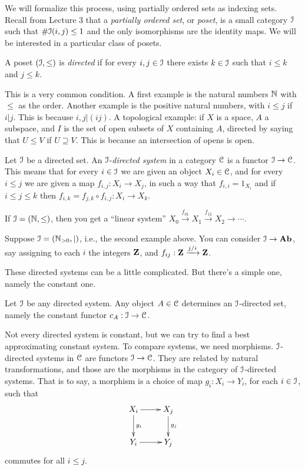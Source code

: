 We will formalize this process, using partially ordered sets as indexing sets.
Recall from Lecture 3 
that a {\em partially ordered set}, or {\em poset}, is a small category $\mathcal I$ such that $\#\mathcal I(i,j)\leq 1$ and the only isomorphisms are the identity maps. We will be interested in a particular class of posets.
\begin{definition}
A poset $(\mathcal I,\leq)$ is \emph{directed} if for every $i,j\in\mathcal I$
there exists  $k\in\mathcal I$ such that $i\leq k$ and $j\leq k$.
\end{definition}
\begin{example}
This is a very common condition.
A first example is the natural numbers $\mathbb N$ with $\leq$ as the order. Another example is the positive natural numbers, with $i\leq j$ if $i|j$. This is because $i,j|(ij)$. A topological example: if $X$ is a space, $A$ a subspace, and 
$I$ is the set of open subsets of $X$ containing $A$, directed by saying that $U\leq V$ if $U\supseteq V$. This is because an intersection of opens is open.
\end{example}
\begin{definition}
Let $\mathcal I$ be a directed set. An $\mathcal I$-{\em directed system} in  a category $\mathcal C$ is a functor $\mathcal I\to\mathcal C$. This means that for every $i\in \mathcal I$ we are given an object $X_i\in\mathcal C$, and for every $i\leq j$ we are given a map $f_{i,j}:X_i\to X_j$, in such a way that $f_{i,i}=1_{X_i}$ and if $i\leq j\leq k$
then $f_{i,k}=f_{j,k}\circ f_{i,j}:X_i\to X_k$. 
\end{definition}
\begin{example}\label{linear}
If $\mathcal I=(\mathbb N,\leq)$, then you get a ``linear system'' $X_0\xrightarrow{f_{01}}X_1\xrightarrow{f_{12}}X_2\to\cdots$. 
\end{example}
\begin{example}
Suppose $\mathcal I=(\mathbb N_{>0},|)$, i.e., the second example above. You can consider $\mathcal I\to\mathbf{Ab}$, say assigning to each $i$ the integers $\mathbf Z$, and $f_{ij}:\mathbf Z\xrightarrow{j/i}\mathbf Z$. 
\end{example}
These directed systems can be a little complicated. But there's a simple one, namely the constant one. 
\begin{example}
Let $\mathcal I$ be any directed system. Any object $A\in\mathcal C$ determines an $\mathcal I$-directed set, namely the constant functor $c_A:\mathcal I\to\mathcal C$.
\end{example}
Not every directed system is constant, but we can try to find a best approximating constant system. To compare systems, we need morphisms. 
$\mathcal I$-directed systems in $\mathcal C$ are functors $\mathcal I\to\mathcal C$. They are related by natural transformations, and those are the morphisms in the category of $\mathcal I$-directed systems. That is to say, a morphism is a choice of map $g_i:X_i\to Y_i$, for each $i\in\mathcal I$, such that 
\begin{equation*}
\xymatrix{X_i\ar[r]\ar[d]^{g_i} & X_j\ar[d]^{g_j}\\
Y_i\ar[r] & Y_j}
\end{equation*}
commutes for all $i\leq j$.

